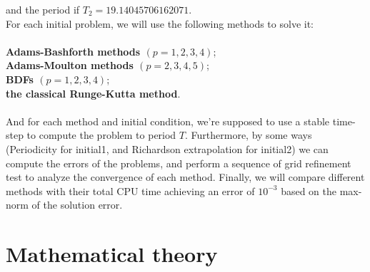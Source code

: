 \documentclass[a4paper,twocolumn]{article}
\theoremstyle{definition}
\begin{document}
and the period if $T_{2}=19.14045706162071 .$\\
For each initial problem, we will use the following methods to solve it:\\\\
\hspace*{1em}\textbf{Adams-Bashforth methods $(p=1,2,3,4)$};\\
\hspace*{1em}\textbf{Adams-Moulton methods $(p=2,3,4,5)$};\\
\hspace*{1em}\textbf{BDFs $(p=1,2,3,4)$};\\
\hspace*{1em}\textbf{the classical Runge-Kutta method}.\\\\
And for each method and initial condition, we're supposed to use a stable time-step to compute the problem to period $T$. Furthermore, by some ways (Periodicity for initial1, and Richardson extrapolation for initial2) we can compute the errors of the problems, and perform a sequence of grid refinement test to analyze the convergence of each method. Finally, we will compare different methods with their total CPU time achieving an error of $10^{-3}$ based on the max-norm of the solution error.
\newpage
\section{Mathematical theory}
\end{document}
